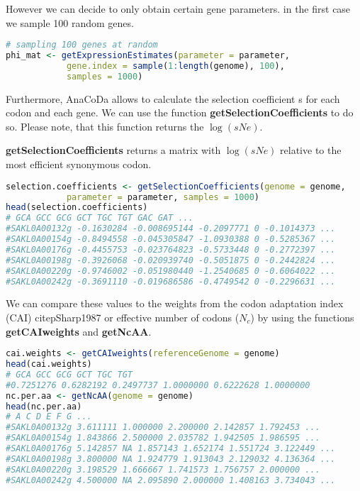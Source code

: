 However we can decide to only obtain certain gene parameters. in the first case we sample 100 random genes.

\begin{lstlisting}[language=R]
# sampling 100 genes at random
phi_mat <- getExpressionEstimates(parameter = parameter,
			gene.index = sample(1:length(genome), 100),
			samples = 1000)
\end{lstlisting}

Furthermore, AnaCoDa allows to calculate the selection coefficient s for each codon and each gene. We can
use the function \textbf{getSelectionCoefficients} to do so. Please note, that this function returns the $\log(sNe)$.

\textbf{getSelectionCoefficients} returns a matrix with $\log(sNe)$ relative to the most efficient synonymous codon.

\begin{lstlisting}[language=R]
selection.coefficients <- getSelectionCoefficients(genome = genome,
			parameter = parameter, samples = 1000)
head(selection.coefficients)
# GCA GCC GCG GCT TGC TGT GAC GAT ...
#SAKL0A00132g -0.1630284 -0.008695144 -0.2097771 0 -0.1014373 ...
#SAKL0A00154g -0.8494558 -0.045305847 -1.0930388 0 -0.5285367 ...
#SAKL0A00176g -0.4455753 -0.023764823 -0.5733448 0 -0.2772397 ...
#SAKL0A00198g -0.3926068 -0.020939740 -0.5051875 0 -0.2442824 ...
#SAKL0A00220g -0.9746002 -0.051980440 -1.2540685 0 -0.6064022 ...
#SAKL0A00242g -0.3691110 -0.019686586 -0.4749542 0 -0.2296631 ...
\end{lstlisting}

We can compare these values to the weights from the codon adaptation index (CAI) citep{Sharp1987} or
effective number of codons ($N_c$) \citep{Wright1990} by using the functions \textbf{getCAIweights} and \textbf{getNcAA}.

\begin{lstlisting}[language=R]
cai.weights <- getCAIweights(referenceGenome = genome)
head(cai.weights)
# GCA GCC GCG GCT TGC TGT
#0.7251276 0.6282192 0.2497737 1.0000000 0.6222628 1.0000000
nc.per.aa <- getNcAA(genome = genome)
head(nc.per.aa)
# A C D E F G ...
#SAKL0A00132g 3.611111 1.000000 2.200000 2.142857 1.792453 ...
#SAKL0A00154g 1.843866 2.500000 2.035782 1.942505 1.986595 ...
#SAKL0A00176g 5.142857 NA 1.857143 1.652174 1.551724 3.122449 ...
#SAKL0A00198g 3.800000 NA 1.924779 1.913043 2.129032 4.136364 ...
#SAKL0A00220g 3.198529 1.666667 1.741573 1.756757 2.000000 ...
#SAKL0A00242g 4.500000 NA 2.095890 2.000000 1.408163 3.734043 ...
\end{lstlisting}

